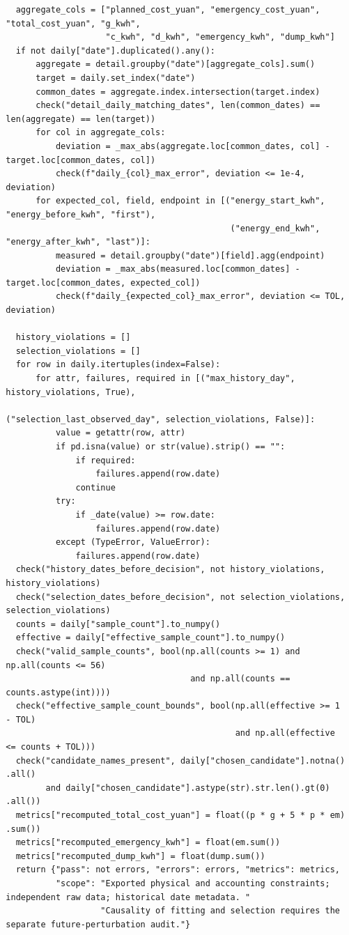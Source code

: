\begin{verbatim}
    aggregate_cols = ["planned_cost_yuan", "emergency_cost_yuan",
  "total_cost_yuan", "g_kwh",
                      "c_kwh", "d_kwh", "emergency_kwh", "dump_kwh"]
    if not daily["date"].duplicated().any():
        aggregate = detail.groupby("date")[aggregate_cols].sum()
        target = daily.set_index("date")
        common_dates = aggregate.index.intersection(target.index)
        check("detail_daily_matching_dates", len(common_dates) ==
  len(aggregate) == len(target))
        for col in aggregate_cols:
            deviation = _max_abs(aggregate.loc[common_dates, col] -
  target.loc[common_dates, col])
            check(f"daily_{col}_max_error", deviation <= 1e-4,
  deviation)
        for expected_col, field, endpoint in [("energy_start_kwh",
  "energy_before_kwh", "first"),
                                               ("energy_end_kwh",
  "energy_after_kwh", "last")]:
            measured = detail.groupby("date")[field].agg(endpoint)
            deviation = _max_abs(measured.loc[common_dates] -
  target.loc[common_dates, expected_col])
            check(f"daily_{expected_col}_max_error", deviation <= TOL,
  deviation)

    history_violations = []
    selection_violations = []
    for row in daily.itertuples(index=False):
        for attr, failures, required in [("max_history_day",
  history_violations, True),

  ("selection_last_observed_day", selection_violations, False)]:
            value = getattr(row, attr)
            if pd.isna(value) or str(value).strip() == "":
                if required:
                    failures.append(row.date)
                continue
            try:
                if _date(value) >= row.date:
                    failures.append(row.date)
            except (TypeError, ValueError):
                failures.append(row.date)
    check("history_dates_before_decision", not history_violations,
  history_violations)
    check("selection_dates_before_decision", not selection_violations,
  selection_violations)
    counts = daily["sample_count"].to_numpy()
    effective = daily["effective_sample_count"].to_numpy()
    check("valid_sample_counts", bool(np.all(counts >= 1) and
  np.all(counts <= 56)
                                       and np.all(counts ==
  counts.astype(int))))
    check("effective_sample_count_bounds", bool(np.all(effective >= 1
  - TOL)
                                                and np.all(effective
  <= counts + TOL)))
    check("candidate_names_present", daily["chosen_candidate"].notna()
  .all()
          and daily["chosen_candidate"].astype(str).str.len().gt(0)
  .all())
    metrics["recomputed_total_cost_yuan"] = float((p * g + 5 * p * em)
  .sum())
    metrics["recomputed_emergency_kwh"] = float(em.sum())
    metrics["recomputed_dump_kwh"] = float(dump.sum())
    return {"pass": not errors, "errors": errors, "metrics": metrics,
            "scope": "Exported physical and accounting constraints;
  independent raw data; historical date metadata. "
                     "Causality of fitting and selection requires the
  separate future-perturbation audit."}



\end{verbatim}
